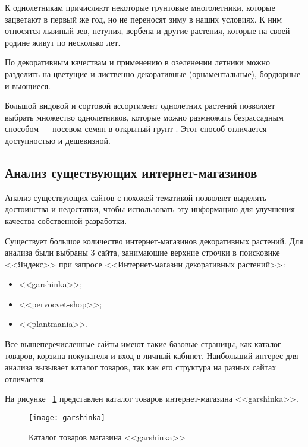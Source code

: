 К однолетникам причисляют некоторые грунтовые многолетники, которые зацветают в первый же год, но не переносят зиму в наших условиях. К ним относятся львиный зев, петуния, вербена и другие растения, которые на своей родине живут по несколько лет.

По декоративным качествам и применению в озеленении летники можно разделить на цветущие и лиственно-декоративные (орнаментальные), бордюрные и вьющиеся.

Большой видовой и сортовой ассортимент однолетних растений позволяет выбрать множество однолетников, которые можно размножать безрассадным способом — посевом семян в открытый грунт \cite{aleksandrova}. Этот способ отличается доступностью и дешевизной.



\subsection{Анализ существующих интернет-магазинов}
\label{shopsAnalize}
Анализ существующих сайтов с похожей тематикой позволяет выделять достоинства и недостатки, чтобы использовать эту информацию для улучшения качества собственной разработки.

Существует большое количество интернет-магазинов декоративных растений. Для анализа были выбраны 3 сайта, занимающие верхние строчки в поисковике <<Яндекс>> при запросе <<Интернет-магазин декоративных растений>>:
\begin{itemize}
	\item <<garshinka>>;
	\item <<pervocvet-shop>>;
	\item <<plantmania>>.
\end{itemize}

Все вышеперечисленные сайты имеют такие базовые страницы, как каталог товаров, корзина покупателя и вход в личный кабинет. Наибольший интерес для анализа вызывает каталог товаров, так как  его структура на разных сайтах отличается.

На рисунке ~\ref{garshinka:image} представлен каталог товаров интернет-магазина <<garshinka>>.

\begin{figure}[h!]
	\texttt{[image: garshinka]}
	\caption{Каталог товаров магазина <<garshinka>>}
	\label{garshinka:image}
\end{figure}


